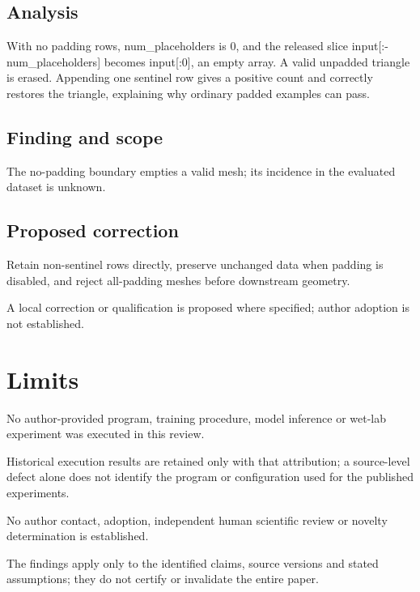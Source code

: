 \documentclass[11pt]{article}
\begin{document}
\subsection*{Analysis}

With no padding rows, num\_placeholders is \(0\), and the released slice input[:-num\_placeholders] becomes input[:\(0\)], an empty array. A valid unpadded triangle is erased. Appending one sentinel row gives a positive count and correctly restores the triangle, explaining why ordinary padded examples can pass.

\subsection*{Finding and scope}

The no-padding boundary empties a valid mesh; its incidence in the evaluated dataset is unknown.

\subsection*{Proposed correction}

Retain non-sentinel rows directly, preserve unchanged data when padding is disabled, and reject all-padding meshes before downstream geometry.

A local correction or qualification is proposed where specified; author adoption is not established.

\section*{Limits}

No author-provided program, training procedure, model inference or wet-lab experiment was executed in this review.\par

Historical execution results are retained only with that attribution; a source-level defect alone does not identify the program or configuration used for the published experiments.\par

No author contact, adoption, independent human scientific review or novelty determination is established.\par

The findings apply only to the identified claims, source versions and stated assumptions; they do not certify or invalidate the entire paper.\par
\end{document}
